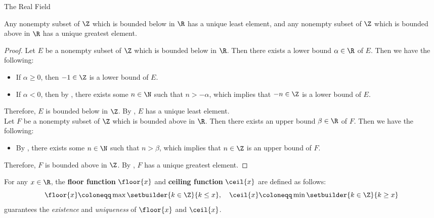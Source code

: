 \begin{section}{The Real Field}
\bigskip

\begin{theorem} \label{thm:BoundedSubsetOfZInRHasExtremum}
    Any nonempty subset of $\Z$ which is bounded below in $\R$ has a unique least element,
    and any nonempty subset of $\Z$ which is bounded above in $\R$ has a unique greatest element.
\end{theorem}

\begin{proof}
    Let $E$ be a nonempty subset of $\Z$ which is bounded below in $\R$. Then there exists a lower bound $\alpha \in \R$
    of $E$. Then we have the following:
    \begin{itemize}
        \item If $\alpha \geq 0$, then $-1 \in \Z$ is a lower bound of $E$.
        \item If $\alpha < 0$, then by , there exists some $n \in \N$
        such that $n > -\alpha$, which implies that $-n \in \Z$ is a lower bound of $E$.
    \end{itemize}
    Therefore, $E$ is bounded below in $\Z$. By , $E$ has a unique least element.
    \\[6mm]
    Let $F$ be a nonempty subset of $\Z$ which is bounded above in $\R$. Then there exists an upper bound $\beta \in \R$
    of $F$. Then we have the following:
    \begin{itemize}
        \item By , there exists some $n \in \N$
        such that $n > \beta$, which implies that $n \in \Z$ is an upper bound of $F$.
    \end{itemize}
    Therefore, $F$ is bounded above in $\Z$. By , $F$ has a unique greatest element.
\end{proof}

\bigskip

\begin{definition} \label{def:FloorCeilingFunctions}
    For any $x \in \R$, the \textbf{floor function} $\floor{x}$
    and \textbf{ceiling function} $\ceil{x}$ are defined as follows:
    \[
    \floor{x} \coloneqq \max\setbuilder{k \in \Z}{k \leq x}, \quad
    \ceil{x} \coloneqq \min\setbuilder{k \in \Z}{k \geq x}
    \]
     guarantees the
    \emph{existence} and \emph{uniqueness} of $\floor{x}$ and $\ceil{x}$.
\end{definition}


\end{section}
